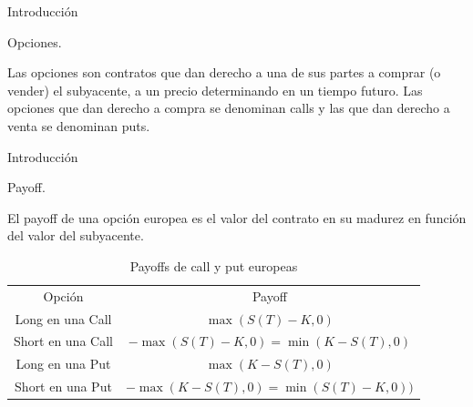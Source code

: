 \documentclass{beamer}
\begin{document}
\begin{frame}{Introducci\'on}

    \begin{block}{Opciones.}

    Las opciones son contratos que dan derecho a una de sus partes a comprar
    (o vender) el subyacente, a un precio determinando en un tiempo futuro.
    Las opciones que dan derecho a compra se denominan calls y las que dan
    derecho a venta se denominan puts.

    \end{block}

\end{frame}



\begin{frame}{Introducci\'on}

  \begin{block}{Payoff.}

    El payoff de una opci\'on europea es el valor del contrato en su madurez en funci\'on del
    valor del subyacente.

  \end{block}
  
  \begin{table}[]
  \begin{center}
  \caption{Payoffs de call y put europeas}
  \label{cua:payoff}
    \begin{tabular}{|c|c|}
     \hline
      Opci\'on & Payoff \\  \hhline{|=|=|}
      Long en una Call & $\max(S(T) - K, 0)$ \\  \hline
      Short en una Call & $- \max(S(T) - K, 0) =\min(K - S(T), 0)$ \\ \hline
      Long en una Put & $\max(K - S(T), 0)$ \\ \hline
      Short en una Put & $-\max(K - S(T), 0) = \min(S(T) - K, 0))$\\ 
      \hline
    \end{tabular}
  \end{center}
  \end{table}  

\end{frame}
\end{document}
